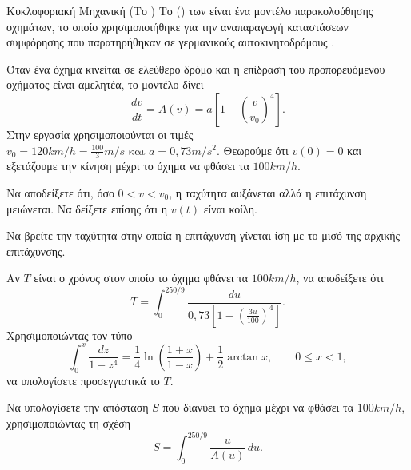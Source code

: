 \begin{problhma}{Κυκλοφοριακή Μηχανική (Το )}
Το  () των
 είναι ένα μοντέλο
παρακολούθησης οχημάτων, το οποίο χρησιμοποιήθηκε για την αναπαραγωγή
καταστάσεων συμφόρησης που παρατηρήθηκαν σε γερμανικούς
αυτοκινητοδρόμους \cite{treiber2000idm}.

Όταν ένα όχημα κινείται σε ελεύθερο δρόμο και η επίδραση του
προπορευόμενου οχήματος είναι αμελητέα, το μοντέλο δίνει
\[
  \frac{dv}{dt}
  =A(v)
  =a\left[1-\left(\frac{v}{v_0}\right)^4\right].
\]
Στην εργασία χρησιμοποιούνται οι τιμές $v_0=120\si{km/h}=\frac{100}{3}\si{m/s}
  \text{ και }
  a=0{,}73\si{m/s^2}. $
Θεωρούμε ότι $v(0)=0$ και εξετάζουμε την κίνηση μέχρι το όχημα να
φθάσει τα $100\si{km/h}$.

\begin{alist}
\item Να αποδείξετε ότι, όσο $0<v<v_0$, η ταχύτητα αυξάνεται αλλά η
      επιτάχυνση μειώνεται. Να δείξετε επίσης ότι η $v(t)$ είναι κοίλη.
\item Να βρείτε την ταχύτητα στην οποία η επιτάχυνση γίνεται ίση με
      το μισό της αρχικής επιτάχυνσης.
\item Αν $T$ είναι ο χρόνος στον οποίο το όχημα φθάνει τα
      $100\si{km/h}$, να αποδείξετε ότι
      \[
        T=\int_0^{250/9}
          \frac{du}{0{,}73\left[1-\left(\frac{3u}{100}\right)^4\right]}.
      \]
      Χρησιμοποιώντας τον τύπο
      \[
        \int_0^x\frac{dz}{1-z^4}
        =\frac14\ln\left(\frac{1+x}{1-x}\right)
         +\frac12\arctan x,
        \qquad 0\leq x<1,
      \]
      να υπολογίσετε προσεγγιστικά το $T$.
\item Να υπολογίσετε την απόσταση $S$ που διανύει το όχημα μέχρι να
      φθάσει τα $100\si{km/h}$, χρησιμοποιώντας τη σχέση
      \[
        S=\int_0^{250/9}\frac{u}{A(u)}\,du.
      \]
\end{alist}

\begin{center}
\end{center}
\end{problhma}
